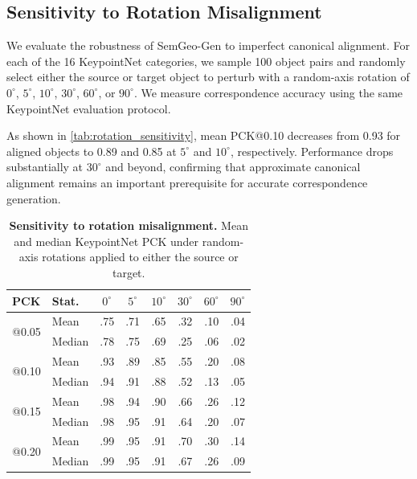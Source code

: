 \subsection{Sensitivity to Rotation Misalignment}
\label{sup:rotation_sensitivity}

We evaluate the robustness of SemGeo-Gen to imperfect
canonical alignment. For each of the 16 KeypointNet
categories, we sample 100 object pairs and randomly
select either the source or target object to perturb
with a random-axis rotation of $0^\circ$, $5^\circ$,
$10^\circ$, $30^\circ$, $60^\circ$, or $90^\circ$.
We measure correspondence accuracy using the same
KeypointNet evaluation protocol.

As shown in \autoref{tab:rotation_sensitivity},
mean PCK@0.10 decreases from 0.93 for aligned objects
to 0.89 and 0.85 at $5^\circ$ and $10^\circ$,
respectively. Performance drops substantially at
$30^\circ$ and beyond, confirming that approximate
canonical alignment remains an important prerequisite
for accurate correspondence generation.

\begin{table}[h]
    \centering
    \captionsetup{justification=centering}
    \fontsize{11}{13}\selectfont
    \setlength{\tabcolsep}{2pt}
    \renewcommand{\arraystretch}{1.05}

    \caption{
        \textbf{Sensitivity to rotation misalignment.}
        Mean and median KeypointNet PCK under random-axis
        rotations applied to either the source or target.
    }
    \label{tab:rotation_sensitivity}
    \vspace{4pt}

    \begin{tabular}{llcccccc}
        \toprule
        PCK & Stat.
        & $0^\circ$ & $5^\circ$ & $10^\circ$
        & $30^\circ$ & $60^\circ$ & $90^\circ$ \\
        \midrule
        \multirow{2}{*}{@0.05}
        & Mean   & .75 & .71 & .65 & .32 & .10 & .04 \\
        & Median & .78 & .75 & .69 & .25 & .06 & .02 \\
        \midrule
        \multirow{2}{*}{@0.10}
        & Mean   & .93 & .89 & .85 & .55 & .20 & .08 \\
        & Median & .94 & .91 & .88 & .52 & .13 & .05 \\
        \midrule
        \multirow{2}{*}{@0.15}
        & Mean   & .98 & .94 & .90 & .66 & .26 & .12 \\
        & Median & .98 & .95 & .91 & .64 & .20 & .07 \\
        \midrule
        \multirow{2}{*}{@0.20}
        & Mean   & .99 & .95 & .91 & .70 & .30 & .14 \\
        & Median & .99 & .95 & .91 & .67 & .26 & .09 \\
        \bottomrule
    \end{tabular}
\end{table}

